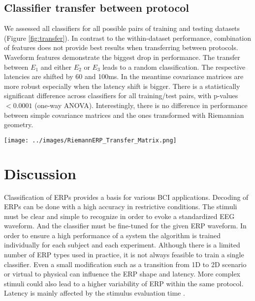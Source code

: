 \documentclass[12pt]{iopart}
\begin{document}
\subsection{Classifier transfer between protocol}
We assessed all classifiers for all possible pairs of training 
and testing datasets (Figure \ref{fig:transfer}).
In contrast to the within-dataset performance, combination of features
does not provide best results when transferring between protocols.
Waveform features demonstrate the biggest drop
in performance. The transfer between $E_1$ and either $E_2$ or $E_3$
leads to a random classification. The respective latencies are shifted by 60 and 100ms.
In the meantime covariance matrices are more robust
especially when the latency shift is bigger.
There is a statistically significant difference across classifiers
for all training/test pairs, with p-values $< 0.0001$ (one-way ANOVA).
Interestingly, there is no difference in performance between simple covariance matrices
and the ones transformed with Riemannian geometry.


\begin{figure*}[!t]
    \centerline{\texttt{[image: ../images/RiemannERP\_Transfer\_Matrix.png]}}
    \caption{Cross-protocol classifier transfer. First three matrices show AUC estimated
    on test dataset (y-axis) with a classifier trained on a training dataset (x-axis).
    The right-most matrix provides p-values obtained with ANOVA when comparing classifiers
    for each train/test pair.}
\label{fig:transfer}
\end{figure*}

\section{Discussion}
\label{sec:discussion}

Classification of ERPs provides a basis for various BCI applications.
Decoding of ERPs can be done with a high accuracy in restrictive conditions.
The stimuli must be clear and simple to recognize
in order to evoke a standardized EEG waveform. And the classifier
must be fine-tuned for the given ERP waveform.
In order to ensure a high performance of a system the algorithm
is trained individually for each subject and each experiment.
Although there is a limited number of ERP types used in practice,
it is not always feasible to train a single classifier. 
Even a small
modification such as a transition from 1D to 2D scenario or virtual to physical
can influence the ERP shape and latency. More complex stimuli
could also lead to a higher variability of ERP within the same protocol.
Latency is mainly affected by the stimulus evaluation time \cite{kutas_augmenting_1977}.
\end{document}
